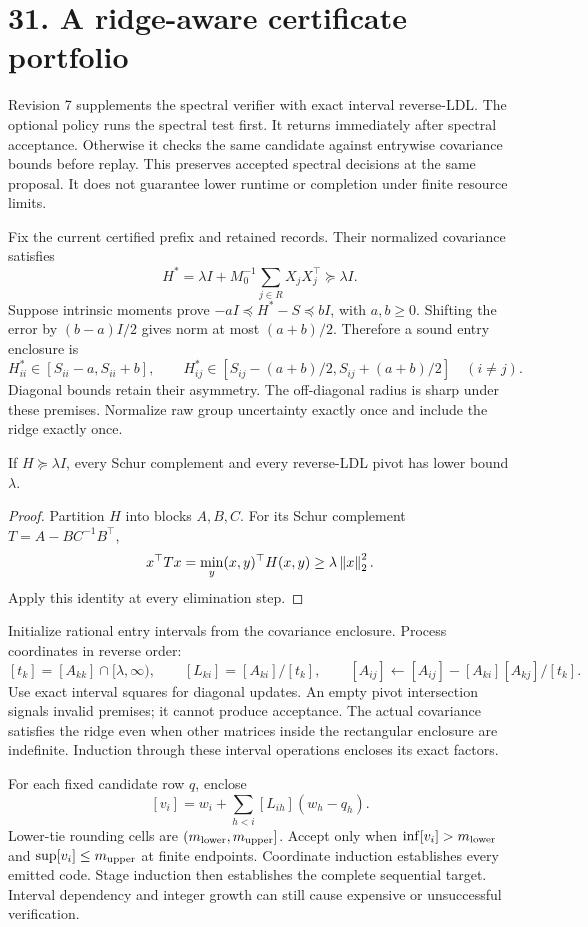 \newpage
\section*{31. A ridge-aware certificate portfolio}
Revision 7 supplements the spectral verifier with exact interval reverse-LDL.
The optional policy runs the spectral test first.
It returns immediately after spectral acceptance.
Otherwise it checks the same candidate against entrywise covariance bounds before replay.
This preserves accepted spectral decisions at the same proposal.
It does not guarantee lower runtime or completion under finite resource limits.

Fix the current certified prefix and retained records.
Their normalized covariance satisfies
\[
 H^*=\lambda I+M_0^{-1}\sum_{j\in R}X_jX_j^\top\succeq\lambda I.
\]
Suppose intrinsic moments prove $-aI\preceq H^*-S\preceq bI$, with $a,b\ge0$.
Shifting the error by $(b-a)I/2$ gives norm at most $(a+b)/2$.
Therefore a sound entry enclosure is
\[
 H^*_{ii}\in[S_{ii}-a,S_{ii}+b],\qquad
 H^*_{ij}\in[S_{ij}-(a+b)/2,S_{ij}+(a+b)/2]\quad(i\ne j).
\]
Diagonal bounds retain their asymmetry.
The off-diagonal radius is sharp under these premises.
Normalize raw group uncertainty exactly once and include the ridge exactly once.

\begin{lemma}
If $H\succeq\lambda I$, every Schur complement and every reverse-LDL pivot has lower bound $\lambda$.
\end{lemma}
\begin{proof}
Partition $H$ into blocks $A,B,C$.
For its Schur complement $T=A-BC^{-1}B^\top$,
\[
 x^\top Tx=\min_y (x,y)^\top H(x,y)
 \ge\lambda\left\|x\right\|_2^2.
\]
Apply this identity at every elimination step.
\end{proof}

Initialize rational entry intervals from the covariance enclosure.
Process coordinates in reverse order:
\[
 [t_k]=[A_{kk}]\cap[\lambda,\infty),\qquad
 [L_{ki}]=[A_{ki}]/[t_k],\qquad
 [A_{ij}]\leftarrow[A_{ij}]-[A_{ki}][A_{kj}]/[t_k].
\]
Use exact interval squares for diagonal updates.
An empty pivot intersection signals invalid premises; it cannot produce acceptance.
The actual covariance satisfies the ridge even when other matrices inside the rectangular enclosure are indefinite.
Induction through these interval operations encloses its exact factors.

For each fixed candidate row $q$, enclose
\[
 [v_i]=w_i+\sum_{h<i}[L_{ih}](w_h-q_h).
\]
Lower-tie rounding cells are $(m_{\rm lower},m_{\rm upper}]$.
Accept only when $\inf[v_i]>m_{\rm lower}$ and $\sup[v_i]\le m_{\rm upper}$ at finite endpoints.
Coordinate induction establishes every emitted code.
Stage induction then establishes the complete sequential target.
Interval dependency and integer growth can still cause expensive or unsuccessful verification.

